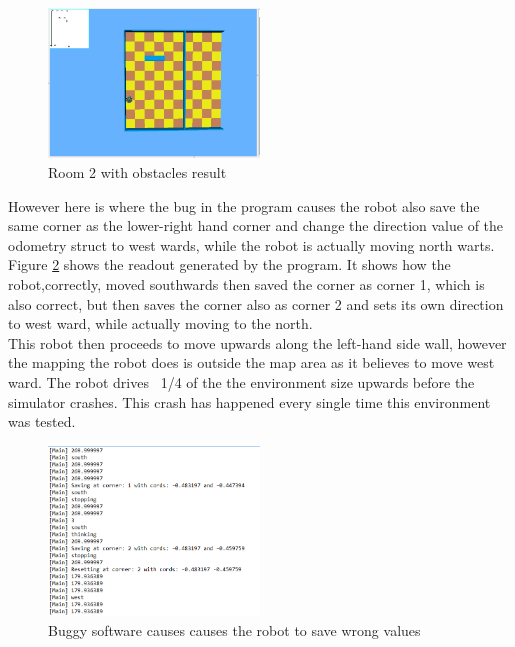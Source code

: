 \begin{figure}[h]
\centering
\includegraphics[width = 0.5\textwidth]{../../figures/map_results/room_2_obstacle_result.png} 
\caption{Room 2 with obstacles result}
\label{room2_obstacles_result}
\end{figure}

However here is where the bug in the program causes the robot also save the same corner as the lower-right hand corner and change the direction value of the odometry struct to west wards, while the robot is actually moving north warts.  \\ 
Figure \ref{room2_saving_error} shows the readout generated by the program. It shows how the robot,correctly, moved southwards then saved the corner as corner 1, which is also correct, but then saves the corner also as corner 2 and sets its own direction to west ward, while actually moving to the north.\\[3ex]

This robot then proceeds to move upwards along the left-hand side wall, however the mapping the robot does is outside the map area as it believes to move west ward. The robot drives ~1/4 of the the environment size upwards before the simulator crashes. This crash has happened every single time this environment was tested. 

\begin{figure}[h]
\centering
\includegraphics[width = 0.5\textwidth]{../../figures/map_results/room2_saving_error.png} 
\caption{Buggy software causes causes the robot to save wrong values}
\label{room2_saving_error}
\end{figure}

